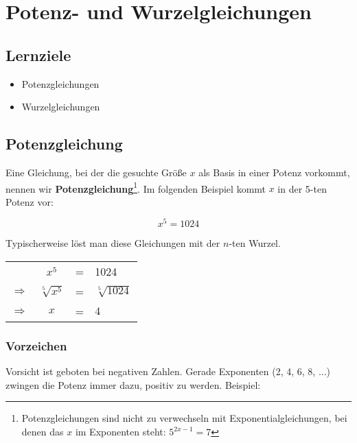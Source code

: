 
\section{Potenz- und Wurzelgleichungen}

\subsection*{Lernziele}

\begin{itemize}
\item Potenzgleichungen
\item Wurzelgleichungen
\end{itemize}
\newpage


\newpage


\subsection{Potenzgleichung}
Eine Gleichung, bei der die gesuchte Größe $x$ als Basis in einer Potenz
vorkommt, nennen wir
\textbf{Potenzgleichung}\footnote{Potenzgleichungen sind nicht zu
  verwechseln mit Exponentialgleichungen, bei denen das $x$ im
  Exponenten steht: $5^{2x-1}=7$}. Im folgenden Beispiel kommt $x$ in
der 5-ten Potenz vor:

$$x^5 = 1024$$

Typischerweise löst man diese Gleichungen mit der $n$-ten Wurzel.

\begin{tabular}{rccl}
  \             & $x^5$           &=& 1024             \\
  $\Rightarrow$ & $\sqrt[5]{x^5}$ &=& $\sqrt[5]{1024}$ \\
  $\Rightarrow$ & $x$             &=& $4$ 
\end{tabular}

\subsubsection{Vorzeichen}
Vorsicht ist geboten bei negativen Zahlen. Gerade Exponenten (2, 4, 6,
8, ...) zwingen die Potenz immer dazu, positiv zu werden. Beispiel:

